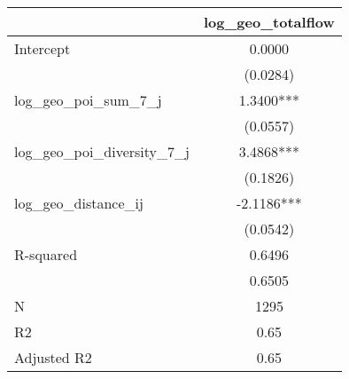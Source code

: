 \begin{table}
\caption{}
\begin{center}
\begin{tabular}{lc}
\hline
                               & log\_geo\_totalflow  \\
\midrule
Intercept                      & 0.0000               \\
                               & (0.0284)             \\
log\_geo\_poi\_sum\_7\_j       & 1.3400***            \\
                               & (0.0557)             \\
log\_geo\_poi\_diversity\_7\_j & 3.4868***            \\
                               & (0.1826)             \\
log\_geo\_distance\_ij         & -2.1186***           \\
                               & (0.0542)             \\
R-squared                      & 0.6496               \\
                               & 0.6505               \\
N                              & 1295                 \\
R2                             & 0.65                 \\
Adjusted R2                    & 0.65                 \\
\hline
\end{tabular}
\end{center}
\end{table}